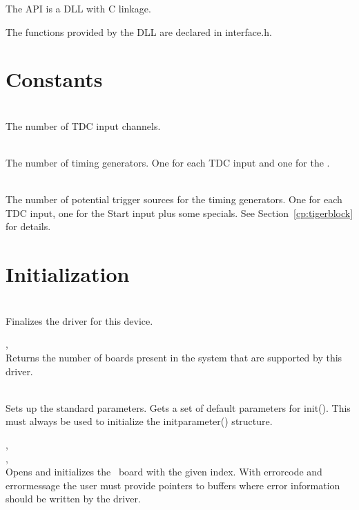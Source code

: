 The API is a DLL with C linkage.\par

The functions provided by the DLL are declared in \textsf{\tu interface.h}.

\section{Constants}

	\\
	The number of TDC input channels.\par

	 \\
	The number of timing generators. One for each TDC input and one for the .\par

	 \\
	The number of potential trigger sources for the timing generators. One for each TDC input, one for the Start input plus some specials. 
	 See Section~\ref{cp:tigerblock} for details.\par

\section{Initialization}
		\\
		Finalizes the driver for this device.

		, \\
		Returns the number of boards present in the system that are supported by this driver.\par

		\\
		Sets up the standard parameters. Gets a set of default parameters for \textsf{\prefix init()}. This must always be used to initialize the \textsf{\prefix init\tu parameter()} structure.\par

		, \\ , \\
		Opens and initializes the \deviceName\ board with the given index. 
		With \textsf{error\tu code} and \textsf{error\tu message} the user must provide pointers to buffers where error information should be written by the driver.\par

